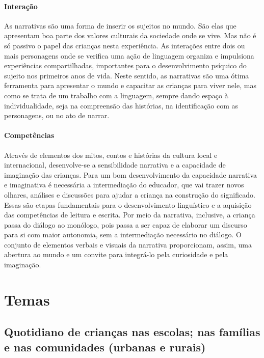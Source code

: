 \documentclass[11pt]{extarticle}
\begin{document}

\paragraph{Interação} As narrativas são uma forma de inserir os sujeitos no mundo. 
São elas que apresentam boa parte dos valores culturais da sociedade 
onde se vive. Mas não é só passivo o papel das crianças nesta experiência. 
As interações entre dois ou mais personagens onde se verifica
uma ação de linguagem organiza e impulsiona experiências compartilhadas,
importantes para o desenvolvimento psíquico do sujeito nos primeiros anos de vida.
Neste sentido, as narrativas são uma ótima ferramenta para
apresentar o mundo e capacitar as crianças para viver nele, mas como se
trata de um trabalho com a linguagem, sempre dando espaço à individualidade, 
seja na compreensão das histórias, na identificação com as personagens, ou 
no ato de narrar.

\paragraph{Competências} 
Através de elementos dos mitos, contos e histórias da cultura local e internacional, desenvolve-se a sensibilidade narrativa e a capacidade de imaginação das crianças. Para um bom desenvolvimento da capacidade narrativa e imaginativa é necessária a intermediação do educador, que vai trazer novos olhares, análises e discussões para ajudar a criança na construção do significado. Essas são etapas fundamentais para o desenvolvimento linguístico e a aquisição das competências de leitura e escrita. Por meio da narrativa, inclusive, a criança passa do diálogo ao monólogo, pois passa a ser capaz de elaborar um discurso para si com maior autonomia, sem a intermediação necessário no diálogo.
O conjunto de elementos verbais e visuais da narrativa proporcionam, assim,
uma abertura ao mundo e um convite para integrá-lo pela curiosidade e pela imaginação.


\section{Temas}

\subsection{Quotidiano de crianças nas escolas; nas famílias e nas comunidades (urbanas e rurais)}
\end{document}
